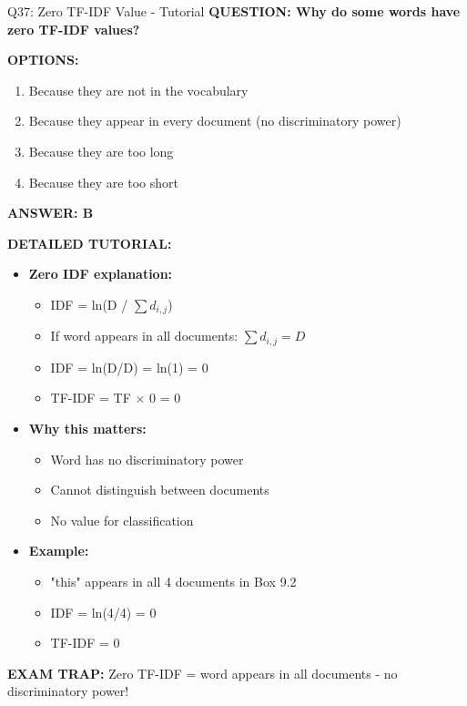 \documentclass[8pt]{beamer}
\begin{document}
	\begin{frame}{Q37: Zero TF-IDF Value - Tutorial}
		\fontsize{6.5}{7.5}\selectfont
		\textbf{QUESTION: Why do some words have zero TF-IDF values?}
		
		\vspace{0.1cm}
		\textbf{OPTIONS:}
		\begin{enumerate}
			\item Because they are not in the vocabulary
			\item Because they appear in every document (no discriminatory power)
			\item Because they are too long
			\item Because they are too short
		\end{enumerate}
		
		\vspace{0.1cm}
		\textcolor{myblue}{\textbf{ANSWER: B}}
		
		\vspace{0.1cm}
		\textbf{DETAILED TUTORIAL:}
		\begin{itemize}
			\item \textbf{Zero IDF explanation:}
			\begin{itemize}
				\item IDF = ln(D / $\sum d_{i,j}$)
				\item If word appears in all documents: $\sum d_{i,j} = D$
				\item IDF = ln(D/D) = ln(1) = 0
				\item TF-IDF = TF $\times$ 0 = 0
			\end{itemize}
			\item \textbf{Why this matters:}
			\begin{itemize}
				\item Word has no discriminatory power
				\item Cannot distinguish between documents
				\item No value for classification
			\end{itemize}
			\item \textbf{Example:}
			\begin{itemize}
				\item "this" appears in all 4 documents in Box 9.2
				\item IDF = ln(4/4) = 0
				\item TF-IDF = 0
			\end{itemize}
		\end{itemize}
		
		\textcolor{myred}{\textbf{EXAM TRAP:}} Zero TF-IDF = \textcolor{myblue}{word appears in all documents} - no discriminatory power!
	\end{frame}
	
\end{document}
